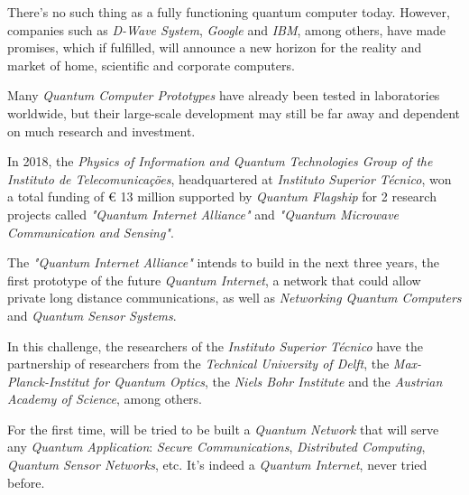 \documentclass[conference]{IEEEtran}
\begin{document}
There's no such thing as a fully functioning quantum computer today. However, companies such as \textit{D-Wave System}, \textit{Google} and \textit{IBM}, among others, have made promises, which if fulfilled, will announce a new horizon for the reality and market of home, scientific and corporate computers.

\vspace{4pt}

Many \textit{Quantum Computer Prototypes} have already been tested in laboratories worldwide, but their large-scale development may still be far away and dependent on much research and investment.

\vspace{4pt}

In 2018, the \textit{Physics of Information and Quantum Technologies Group of the Instituto de Telecomunica\c{c}\"oes}, headquartered at \textit{Instituto Superior T\'ecnico}, won a total funding of \euro\hspace{0.05mm} 13 million supported by \textit{Quantum Flagship} for 2 research projects called \textit{"Quantum Internet Alliance"} and \textit{"Quantum Microwave Communication and Sensing"}.

\newpage

The \textit{"Quantum Internet Alliance"} intends to build in the next three years, the first prototype of the future \textit{Quantum Internet}, a network that could allow private long distance communications, as well as \textit{Networking Quantum Computers} and \textit{Quantum Sensor Systems}.

\vspace{4pt}

In this challenge, the researchers of the \textit{Instituto Superior T\'ecnico} have the partnership of researchers from the \textit{Technical University of Delft}, the \textit{Max-Planck-Institut for Quantum Optics}, the \textit{Niels Bohr Institute} and the \textit{Austrian Academy of Science}, among others.

\vspace{4pt}

For the first time, will be tried to be built a \textit{Quantum Network} that will serve any \textit{Quantum Application}: \textit{Secure Communications}, \textit{Distributed Computing}, \textit{Quantum Sensor Networks}, etc. It's indeed a \textit{Quantum Internet}, never tried before.

\vspace{4pt}
\end{document}
